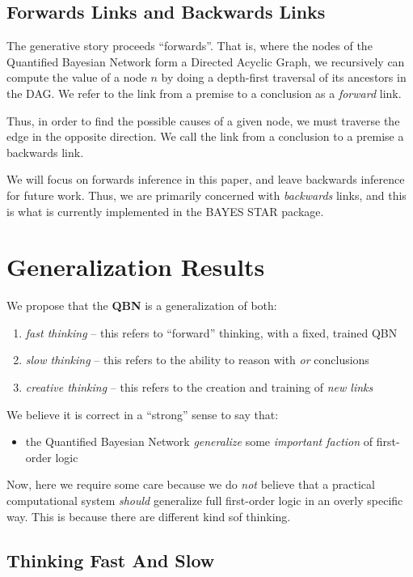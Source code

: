 \documentclass[12pt]{article}
\begin{document}
\subsection{Forwards Links and Backwards Links}
The generative story proceeds ``forwards''.
That is, where the nodes of the Quantified Bayesian Network form a Directed Acyclic Graph, we recursively can compute the value of a node \( n \) by doing a depth-first traversal of its ancestors in the DAG.
We refer to the link from a premise to a conclusion as a \emph{forward} link.

Thus, in order to find the possible causes of a given node, we must traverse the edge in the opposite direction.
We call the link from a conclusion to a premise a backwards link.

We will focus on forwards inference in this paper, and leave backwards inference for future work.
Thus, we are primarily concerned with \emph{backwards} links, and this is what is currently implemented in the BAYES STAR package.

\section{Generalization Results}
We propose that the {\bf QBN} is a generalization of both:
\begin{enumerate}
    \item {\em fast thinking} -- this refers to ``forward'' thinking, with a fixed, trained QBN
    \item {\em slow thinking} -- this refers to the ability to reason with {\em or} conclusions
    \item {\em creative thinking} -- this refers to the creation and training of {\em new links}
\end{enumerate}

We believe it is correct in a ``strong'' sense to say that:
\begin{itemize}
    \item the Quantified Bayesian Network {\em generalize} some {\em important faction} of first-order logic
\end{itemize}

Now, here we require some care because we do {\em not} believe that a practical computational system {\em should} generalize full first-order logic in an overly specific way.
This is because there are different kind sof thinking.

\subsection{Thinking Fast And Slow}
\end{document}
